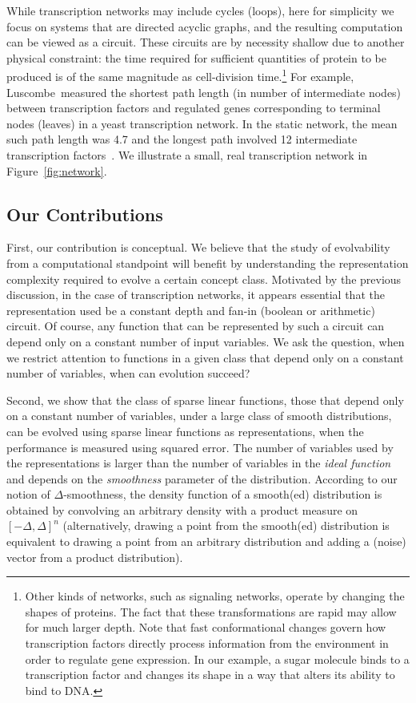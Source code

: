 While transcription networks may include cycles (loops), here for simplicity we
focus on systems that are directed acyclic graphs, and the resulting computation
can be viewed as a circuit. These circuits are by necessity shallow due to
another physical constraint: the time required for sufficient quantities of
protein to be produced is of the same magnitude as cell-division
time.\footnote{Other kinds of networks, such as signaling networks, operate by
changing the shapes of proteins. The fact that these transformations are rapid
may allow for much larger depth. Note that fast conformational changes govern
how transcription factors directly process information from the environment in
order to regulate gene expression.  In our example, a sugar molecule binds to a
transcription factor and changes its shape in a way that alters its ability to
bind to DNA.} For example, Luscombe~\etal measured the shortest path length (in
number of intermediate nodes) between transcription factors and regulated genes
corresponding to terminal nodes (leaves) in a yeast transcription network. In
the static network, the mean such path length was 4.7 and the longest path
involved 12 intermediate transcription factors~\cite{Luscombe:2004}.  We
illustrate a small, real transcription network in Figure~\ref{fig:network}.

\subsection{Our Contributions}

First, our contribution is conceptual. We believe that the study of evolvability from
a computational standpoint will benefit by understanding the representation
complexity required to evolve a certain concept class. Motivated by the previous
discussion, in the case of transcription networks, it appears essential that the
representation used be a constant depth and fan-in (boolean or arithmetic)
circuit. Of course, any function that can be represented by such a circuit can
depend only on a constant number of input variables. We ask the
question, when we restrict attention to functions in a given class that depend
only on a constant number of variables, when can evolution succeed?

Second, we show that the class of sparse linear functions, those that depend
only on a constant number of variables, under a large class of smooth
distributions, can be evolved using sparse linear functions as representations,
when the performance is measured using squared error. The number of variables
used by the representations is larger than the number of variables in the
\emph{ideal function} and depends on the \emph{smoothness} parameter of the
distribution. According to our notion of $\Delta$-smoothness, the density
function of a smooth(ed) distribution is obtained by convolving an arbitrary
density with a product measure on $[-\Delta, \Delta]^n$ (alternatively, drawing
a point from the smooth(ed) distribution is equivalent to drawing a point from
an arbitrary distribution and adding a (noise) vector from a product
distribution). 

